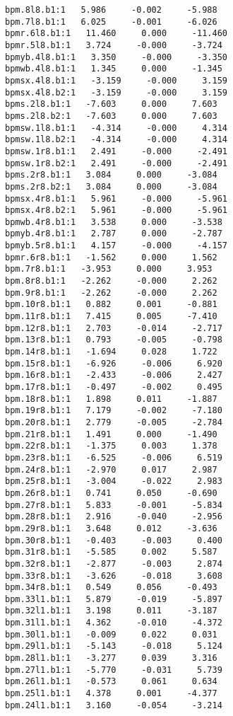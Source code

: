 \begin{verbatim}
bpm.8l8.b1:1   5.986     -0.002     -5.988
bpm.7l8.b1:1   6.025     -0.001     -6.026
bpmr.6l8.b1:1   11.460     0.000     -11.460
bpmr.5l8.b1:1   3.724     -0.000     -3.724
bpmyb.4l8.b1:1   3.350     -0.000     -3.350
bpmwb.4l8.b1:1   1.345     0.000     -1.345
bpmsx.4l8.b1:1   -3.159     -0.000     3.159
bpmsx.4l8.b2:1   -3.159     -0.000     3.159
bpms.2l8.b1:1   -7.603     0.000     7.603
bpms.2l8.b2:1   -7.603     0.000     7.603
bpmsw.1l8.b1:1   -4.314     -0.000     4.314
bpmsw.1l8.b2:1   -4.314     -0.000     4.314
bpmsw.1r8.b1:1   2.491     -0.000     -2.491
bpmsw.1r8.b2:1   2.491     -0.000     -2.491
bpms.2r8.b1:1   3.084     0.000     -3.084
bpms.2r8.b2:1   3.084     0.000     -3.084
bpmsx.4r8.b1:1   5.961     -0.000     -5.961
bpmsx.4r8.b2:1   5.961     -0.000     -5.961
bpmwb.4r8.b1:1   3.538     0.000     -3.538
bpmyb.4r8.b1:1   2.787     0.000     -2.787
bpmyb.5r8.b1:1   4.157     -0.000     -4.157
bpmr.6r8.b1:1   -1.562     0.000     1.562
bpm.7r8.b1:1   -3.953     0.000     3.953
bpm.8r8.b1:1   -2.262     -0.000     2.262
bpm.9r8.b1:1   -2.262     -0.000     2.262
bpm.10r8.b1:1   0.882     0.001     -0.881
bpm.11r8.b1:1   7.415     0.005     -7.410
bpm.12r8.b1:1   2.703     -0.014     -2.717
bpm.13r8.b1:1   0.793     -0.005     -0.798
bpm.14r8.b1:1   -1.694     0.028     1.722
bpm.15r8.b1:1   -6.926     -0.006     6.920
bpm.16r8.b1:1   -2.433     -0.006     2.427
bpm.17r8.b1:1   -0.497     -0.002     0.495
bpm.18r8.b1:1   1.898     0.011     -1.887
bpm.19r8.b1:1   7.179     -0.002     -7.180
bpm.20r8.b1:1   2.779     -0.005     -2.784
bpm.21r8.b1:1   1.491     0.000     -1.490
bpm.22r8.b1:1   -1.375     0.003     1.378
bpm.23r8.b1:1   -6.525     -0.006     6.519
bpm.24r8.b1:1   -2.970     0.017     2.987
bpm.25r8.b1:1   -3.004     -0.022     2.983
bpm.26r8.b1:1   0.741     0.050     -0.690
bpm.27r8.b1:1   5.833     -0.001     -5.834
bpm.28r8.b1:1   2.916     -0.040     -2.956
bpm.29r8.b1:1   3.648     0.012     -3.636
bpm.30r8.b1:1   -0.403     -0.003     0.400
bpm.31r8.b1:1   -5.585     0.002     5.587
bpm.32r8.b1:1   -2.877     -0.003     2.874
bpm.33r8.b1:1   -3.626     -0.018     3.608
bpm.34r8.b1:1   0.549     0.056     -0.493
bpm.33l1.b1:1   5.879     -0.019     -5.897
bpm.32l1.b1:1   3.198     0.011     -3.187
bpm.31l1.b1:1   4.362     -0.010     -4.372
bpm.30l1.b1:1   -0.009     0.022     0.031
bpm.29l1.b1:1   -5.143     -0.018     5.124
bpm.28l1.b1:1   -3.277     0.039     3.316
bpm.27l1.b1:1   -5.770     -0.031     5.739
bpm.26l1.b1:1   -0.573     0.061     0.634
bpm.25l1.b1:1   4.378     0.001     -4.377
bpm.24l1.b1:1   3.160     -0.054     -3.214

\end{verbatim}

